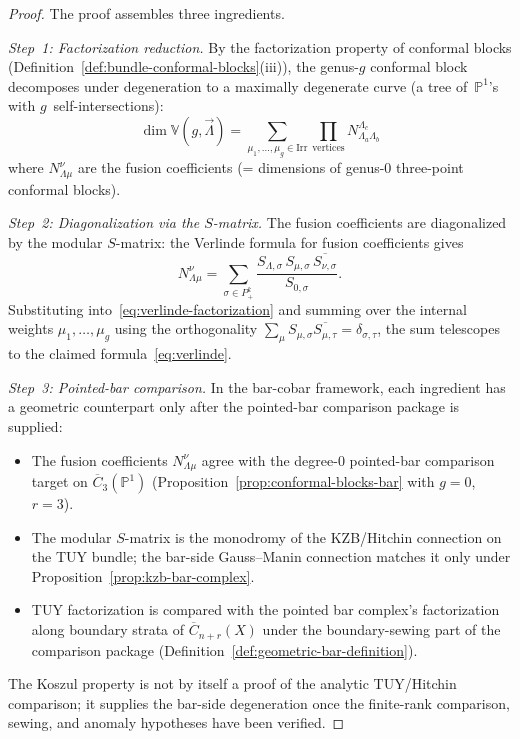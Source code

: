 \begin{proof}
The proof assembles three ingredients.

\emph{Step~1: Factorization reduction.}
By the factorization property of conformal blocks
(Defi\-nition~\ref{def:bundle-conformal-blocks}(iii)),
the genus-$g$ conformal block decomposes under degeneration
to a maximally degenerate curve
(a tree of~$\mathbb{P}^1$'s with $g$~self-intersections):
\begin{equation}\label{eq:verlinde-factorization}
\dim \mathbb{V}(g, \vec{\Lambda})
= \sum_{\mu_1, \ldots, \mu_g \in \mathrm{Irr}}
\prod_{\text{vertices}} N_{\Lambda_a \Lambda_b}^{\Lambda_c}
\end{equation}
where $N_{\Lambda \mu}^{\nu}$ are the fusion coefficients
(= dimensions of genus-$0$ three-point conformal blocks).

\emph{Step~2: Diagonalization via the $S$-matrix.}
The fusion coefficients are diagonalized by the modular
$S$-matrix: the Verlinde formula for fusion coefficients gives
\[
N_{\Lambda\mu}^{\nu}
= \sum_{\sigma \in P_+^k}
\frac{S_{\Lambda,\sigma}\, S_{\mu,\sigma}\,
\overline{S_{\nu,\sigma}}}{S_{0,\sigma}}.
\]
Substituting into~\eqref{eq:verlinde-factorization} and summing
over the internal weights $\mu_1, \ldots, \mu_g$ using the
orthogonality $\sum_\mu S_{\mu,\sigma} \overline{S_{\mu,\tau}}
= \delta_{\sigma,\tau}$, the sum telescopes to the claimed
formula~\eqref{eq:verlinde}.

\emph{Step~3: Pointed-bar comparison.}
In the bar-cobar framework, each ingredient has a geometric
counterpart only after the pointed-bar comparison package is supplied:
\begin{itemize}
\item The fusion coefficients $N_{\Lambda\mu}^{\nu}$ agree with the
 degree-$0$ pointed-bar comparison target on
 $\overline{C}_3(\mathbb{P}^1)$
 (Proposition~\ref{prop:conformal-blocks-bar} with $g = 0$,
 $r = 3$).
\item The modular $S$-matrix is the monodromy of the KZB/Hitchin
 connection on the TUY bundle; the bar-side Gauss--Manin connection
 matches it only under Proposition~\ref{prop:kzb-bar-complex}.
\item TUY factorization is compared with the pointed bar complex's
 factorization along boundary strata of $\overline{C}_{n+r}(X)$ under
 the boundary-sewing part of the comparison package
 \textup{(}Definition~\ref{def:geometric-bar-definition}\textup{)}.
\end{itemize}
The Koszul property is not by itself a proof of the analytic
TUY/Hitchin comparison; it supplies the bar-side degeneration once the
finite-rank comparison, sewing, and anomaly hypotheses have been
verified.
\end{proof}

